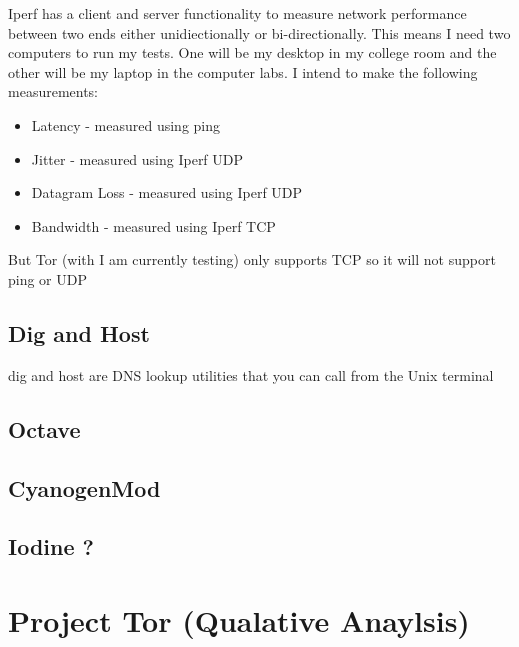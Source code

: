 \documentclass[12pt,a4paper,oneside]{article}
\begin{document}
Iperf has a client and server functionality to measure network performance between two ends either unidiectionally or bi-directionally. This means I need two computers to run my tests. One will be my desktop in my college room and the other will be my laptop in the computer labs. I intend to make the following measurements:
\begin{itemize}
\item Latency - measured using ping
\item Jitter - measured using Iperf UDP
\item Datagram Loss - measured using Iperf UDP
\item Bandwidth - measured using Iperf TCP
\end{itemize}

But Tor (with I am currently testing) only supports TCP so it will not support ping or UDP


\subsection{Dig and Host}
dig and host are DNS lookup utilities that you can call from the Unix terminal
\subsection{Octave}

\subsection{CyanogenMod}

\subsection{Iodine ?}


\section{Project Tor (Qualative Anaylsis)}
\end{document}
